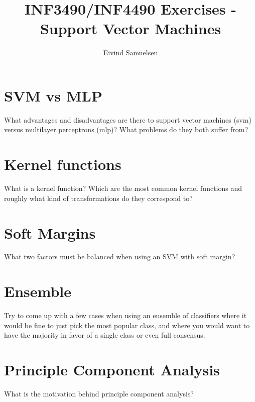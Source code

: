 
\title{\vspace{-2cm}INF3490/INF4490 Exercises - Support Vector Machines}
\author{Eivind Samuelsen}
\date{}

\setlength\parindent{0pt}


    \renewcommand\marginsymbol[1][0pt]{%
  \tabto*{0cm}\makebox[-1cm][c]{$\mathbb{P}$}\tabto*{\TabPrevPos}}

\maketitle


\section{SVM vs MLP}
What advantages and disadvantages are there to support vector machines (svm) versus multilayer perceptrons (mlp)?
What problems do they both suffer from?

\section{Kernel functions}
What is a kernel function?
Which are the most common kernel functions and roughly what kind of transformations do they correspond to?

\section{Soft Margins}
What two factors must be balanced when using an SVM with soft margin?

\section{Ensemble}
Try to come up with a few cases when using an ensemble of classifiers where it would be fine to just pick the most popular class, and where you would want to have the majority in favor of a single class or even full consensus.

\section{Principle Component Analysis}
What is the motivation behind principle component analysis?

